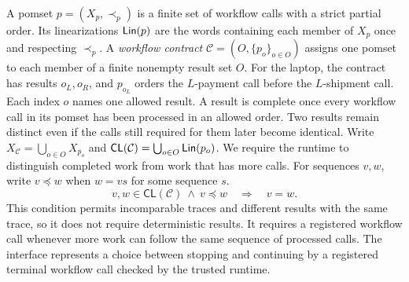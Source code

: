 A pomset \(p=(X_p,\prec_p)\) is a finite set of workflow calls with a strict partial order.
Its linearizations \(\mathsf{Lin}(p)\) are the words containing each member of \(X_p\) once and respecting \(\prec_p\).
A \emph{workflow contract} \(\mathcal C=(O,\{p_o\}_{o\in O})\) assigns one pomset to each member of a finite nonempty result set \(O\).
For the laptop, the contract has results \(o_L,o_R\), and \(p_{o_L}\) orders the \(L\)-payment call before the \(L\)-shipment call.
Each index \(o\) names one allowed result.
A result is complete once every workflow call in its pomset has been processed in an allowed order.
Two results remain distinct even if the calls still required for them later become identical.
Write \(X_{\mathcal C}=\bigcup_{o\in O}X_{p_o}\) and \(\mathsf{CL}(\mathcal C)=\bigcup_{o\in O}\mathsf{Lin}(p_o)\).
We require the runtime to distinguish completed work from work that has more calls.
For sequences \(v,w\), write \(v\preceq w\) when \(w=vs\) for some sequence \(s\).
\[
 v,w\in\mathsf{CL}(\mathcal C)\ \land\
 v\preceq w \quad\Longrightarrow\quad v=w .
\]
This condition permits incomparable traces and different results with the same trace, so it does not require deterministic results.
It requires a registered workflow call whenever more work can follow the same sequence of processed calls.
The interface represents a choice between stopping and continuing by a registered terminal workflow call checked by the trusted runtime.

